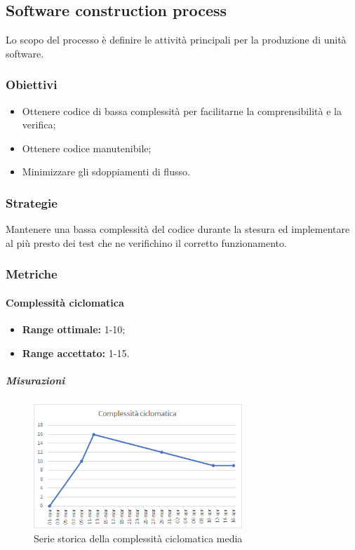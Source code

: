 	\subsection{Software construction process}
	\label{sub:qdp2}
	Lo scopo del processo è definire le attività principali per la produzione di unità software.
		\subsubsection{Obiettivi}
		\begin{itemize}
			\item Ottenere codice di bassa complessità per facilitarne la comprensibilità e la verifica;
			\item Ottenere codice manutenibile;
			\item Minimizzare gli sdoppiamenti di flusso.
		\end{itemize}
		\subsubsection{Strategie}
		Mantenere una bassa complessità del codice durante la stesura ed implementare al più presto dei test che ne verifichino il corretto funzionamento.
		\subsubsection{Metriche}
			\paragraph{Complessità ciclomatica} \Spazio
			\begin{itemize}
				\item \textbf{Range ottimale:} 1-10;
				\item \textbf{Range accettato:} 1-15.
			\end{itemize}
		    \subparagraph{Misurazioni}
		    \begin{figure}[H]
		    	\centering 
		    	\includegraphics[width=0.7\textwidth]{Images/ciclo.png}
		    	\caption{Serie storica della complessità ciclomatica media}
		    	\label{ciclo} 
		    \end{figure}
